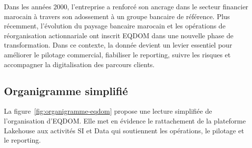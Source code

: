 Dans les années 2000, l'entreprise a renforcé son ancrage dans le secteur financier marocain à travers son adossement à un groupe bancaire de référence. Plus récemment, l'évolution du paysage bancaire marocain et les opérations de réorganisation actionnariale ont inscrit EQDOM dans une nouvelle phase de transformation. Dans ce contexte, la donnée devient un levier essentiel pour améliorer le pilotage commercial, fiabiliser le reporting, suivre les risques et accompagner la digitalisation des parcours clients.

\subsection{Organigramme simplifié}

La figure~\ref{fig:organigramme-eqdom} propose une lecture simplifiée de l'organisation d'EQDOM. Elle met en évidence le rattachement de la plateforme Lakehouse aux activités SI et Data qui soutiennent les opérations, le pilotage et le reporting.

